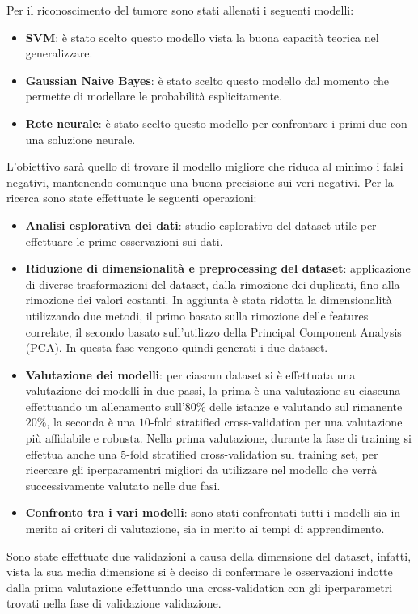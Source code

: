Per il riconoscimento del tumore sono stati allenati i seguenti modelli:
\begin{itemize}
    \item \textbf{SVM}: è stato scelto questo modello vista la buona capacità
          teorica nel generalizzare.
    \item \textbf{Gaussian Naive Bayes}: è stato scelto questo modello dal
          momento che permette di modellare le probabilità esplicitamente.
    \item \textbf{Rete neurale}: è stato scelto questo modello per confrontare
          i primi due con una soluzione neurale.
\end{itemize}
L'obiettivo sarà quello di trovare il modello migliore che riduca al minimo i
falsi negativi, mantenendo comunque una buona precisione sui veri negativi. Per
la ricerca sono state effettuate le seguenti operazioni:
\begin{itemize}
    \item \textbf{Analisi esplorativa dei dati}: studio esplorativo del dataset
          utile per effettuare le prime osservazioni sui dati.
    \item \textbf{Riduzione di dimensionalità e preprocessing del dataset}:
          applicazione di diverse trasformazioni del dataset, dalla rimozione
          dei duplicati, fino alla rimozione dei valori costanti. In aggiunta è
          stata ridotta la dimensionalità utilizzando due metodi, il primo
          basato sulla rimozione delle features correlate, il secondo basato
          sull'utilizzo della Principal Component Analysis (PCA). In questa fase
          vengono quindi generati i due dataset.
    \item \textbf{Valutazione dei modelli}: per ciascun dataset si è effettuata
          una valutazione dei modelli in due passi, la prima è una valutazione
          su ciascuna effettuando un allenamento sull'$80\%$ delle istanze e
          valutando sul rimanente $20\%$, la seconda è una $10$-fold stratified
          cross-validation per una valutazione più affidabile e robusta.
          Nella prima valutazione, durante la fase di training si effettua anche
          una $5$-fold stratified cross-validation sul training set, per
          ricercare gli iperparamentri migliori da utilizzare nel modello che
          verrà successivamente valutato nelle due fasi.
    \item \textbf{Confronto tra i vari modelli}: sono stati confrontati tutti
          i modelli sia in merito ai criteri di valutazione, sia in merito ai
          tempi di apprendimento.
\end{itemize}
Sono state effettuate due validazioni a causa della dimensione del dataset,
infatti, vista la sua media dimensione si è deciso di confermare le osservazioni
indotte dalla prima valutazione effettuando una cross-validation con gli
iperparametri trovati nella fase di validazione validazione.

